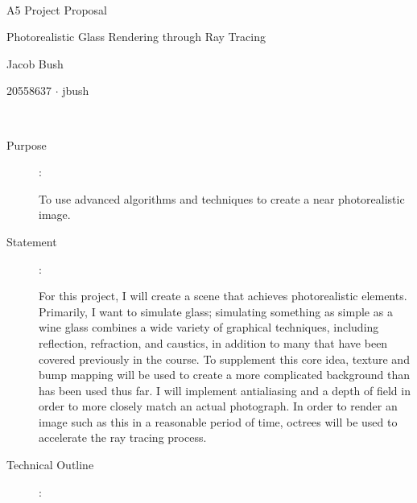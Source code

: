 \documentclass {article}
\begin{document}
~\vfill
\begin{center}
\Large

A5 Project Proposal
\vfill

{\LARGE Photorealistic Glass Rendering through Ray Tracing}

\vfill
Jacob Bush

20558637 $\cdot$
jbush
\end{center}
\vfill ~\vfill~
\newpage
{}
\begin{description}
\item[Purpose]:

    To use advanced algorithms and techniques to create a near photorealistic image.

\item[Statement]:






    For this project, I will create a scene that achieves photorealistic elements. Primarily, I want to simulate glass; simulating something as simple as a wine glass combines a wide variety of graphical techniques, including reflection, refraction, and caustics, in addition to many that have been covered previously in the course. To supplement this core idea, texture and bump mapping will be used to create a more complicated background than has been used thus far. I will implement antialiasing and a depth of field in order to more closely match an actual photograph. In order to render an image such as this in a reasonable period of time, octrees will be used to accelerate the ray tracing process.

\item[Technical Outline]:



\end{description}
\end{document}

